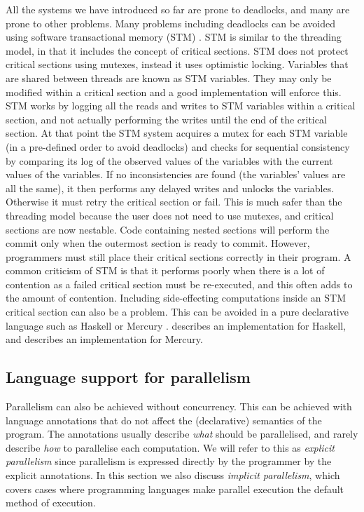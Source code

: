 All the systems we have introduced so far are prone to deadlocks,
and many are prone to other problems.
Many problems including deadlocks can be avoided using software
transactional memory (STM) \citep{stm}.
STM is similar to the threading model,
in that it includes the concept of critical sections.
STM does not protect critical sections using mutexes,
instead it uses optimistic locking.
Variables that are shared between threads are known as STM variables.
They may only be modified within a critical section and a good implementation
will enforce this.
STM works by logging all the reads and writes to STM variables within a
critical section,
and not actually performing the writes until the end of the critical
section.
At that point the STM system acquires a mutex for each STM variable
(in a pre-defined order to avoid deadlocks)
and checks for sequential consistency by comparing its log of the observed
values of the variables with the current
values of the variables.
If no inconsistencies are found (the variables' values are all the same),
it then performs any delayed writes and unlocks the variables.
Otherwise it must retry the critical section or fail.
This is much safer than the threading model because
the user does not need to use mutexes,
and critical sections are now nestable.
Code containing nested sections will perform the commit only when the 
outermost section is ready to commit.
However, programmers must still place their critical sections correctly in
their program.
A common criticism of STM is that it performs poorly when there is a lot of
contention as a failed critical section must be re-executed,
and this often adds to the amount of contention.
Including side-effecting computations inside an STM critical section can also
be a problem.
This can be avoided in a pure declarative language such as
Haskell \citep{haskell98} or Mercury \citep{mercury_jlp}.
\citet*{harris:2005:haskell-stm} describes an implementation for Haskell,
and \citet*{mika:mercury-stm} describes an implementation for Mercury.

\subsection{Language support for parallelism}
\label{sec:intro_par}

Parallelism can also be achieved without concurrency.
This can be achieved with language annotations that do not affect the
(declarative) semantics of the program.
The annotations usually describe \emph{what} should be parallelised,
and rarely describe \emph{how} to parallelise each computation.
We will refer to this as \emph{explicit parallelism}
since parallelism is expressed directly by the programmer by the explicit
annotations.
In this section we also discuss \emph{implicit parallelism},
which covers cases where programming languages make parallel execution the
default method of execution.

